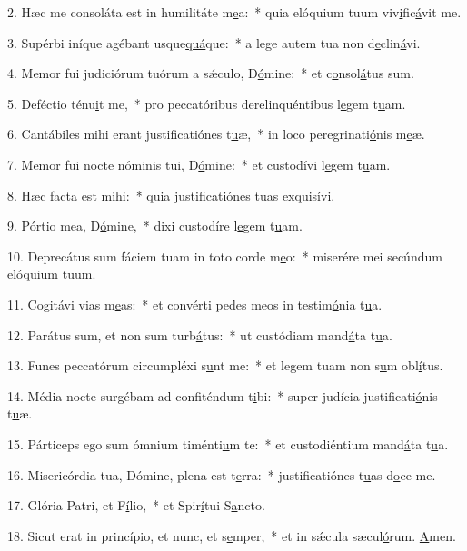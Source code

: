 2. Hæc me consoláta est in humilitáte m\uline{e}a:~* quia elóquium tuum viv\uline{i}fic\uline{á}vit me.\par 
3. Supérbi iníque agébant usque\uline{quá}que:~* a lege autem tua non d\uline{e}clin\uline{á}vi.\par 
4. Memor fui judiciórum tuórum a sǽculo, D\uline{ó}mine:~* et c\uline{o}nsol\uline{á}tus sum.\par 
5. Deféctio ténu\uline{i}t me,~* pro peccatóribus derelinquéntibus l\uline{e}gem t\uline{u}am.\par 
6. Cantábiles mihi erant justificatiónes t\uline{u}æ,~* in loco peregrinati\uline{ó}nis m\uline{e}æ.\par 
7. Memor fui nocte nóminis tui, D\uline{ó}mine:~* et custodívi l\uline{e}gem t\uline{u}am.\par 
8. Hæc facta est m\uline{i}hi:~* quia justificatiónes tuas \uline{e}xquis\uline{í}vi.\par 
9. Pórtio mea, D\uline{ó}mine,~* dixi custodíre l\uline{e}gem t\uline{u}am.\par 
10. Deprecátus sum fáciem tuam in toto corde m\uline{e}o:~* miserére mei secúndum el\uline{ó}quium t\uline{u}um.\par 
11. Cogitávi vias m\uline{e}as:~* et convérti pedes meos in testim\uline{ó}nia t\uline{u}a.\par 
12. Parátus sum, et non sum turb\uline{á}tus:~* ut custódiam mand\uline{á}ta t\uline{u}a.\par 
13. Funes peccatórum circumpléxi s\uline{u}nt me:~* et legem tuam non s\uline{u}m obl\uline{í}tus.\par 
14. Média nocte surgébam ad confiténdum t\uline{i}bi:~* super judícia justificati\uline{ó}nis t\uline{u}æ.\par 
15. Párticeps ego sum ómnium timénti\uline{u}m te:~* et custodiéntium mand\uline{á}ta t\uline{u}a.\par 
16. Misericórdia tua, Dómine, plena est t\uline{e}rra:~* justificatiónes t\uline{u}as d\uline{o}ce me.\par 
17. Glória Patri, et F\uline{í}lio,~* et Spir\uline{í}tui S\uline{a}ncto.\par 
18. Sicut erat in princípio, et nunc, et s\uline{e}mper,~* et in sǽcula sæcul\uline{ó}rum. \uline{A}men.\par 
